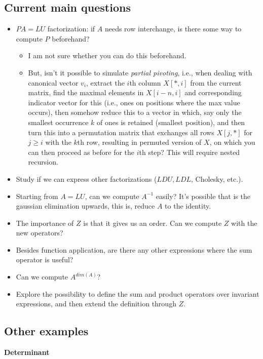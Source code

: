 \subsection{Current main questions}
\begin{itemize}

\item $PA=LU$ factorization: if $A$ needs row interchange, is there some way to compute $P$ beforehand?
\begin{itemize}
\item I am not sure whether you can do this beforehand.
\item But, isn't it possible to simulate \emph{partial pivoting}, i.e., when dealing with canonical vector $v_i$, extract the $i$th column $X[*,i]$ from the current
matrix, find the maximal elements in $X[i-n,i]$ and corresponding indicator vector for this (i.e., ones on positions where the max value occurs), then somehow
reduce this to a vector in which, say only the smallest occurrence $k$ of ones is retained (smallest position), and then turn this into a permutation matrix that exchanges
all rows $X[j,*]$ for $j\geq i$ with the $k$th row, resulting in permuted version of $X$, on which you can then proceed as before for the $i$th step? This will require nested
recursion.
\end{itemize}
\item Study if we can express other factorizations ($LDU, LDL$,
Cholesky, etc.).
\item Starting from $A=LU$, can we compute $A^{-1}$ easily? It's possible that is the gaussian elimination upwards, this is, reduce $A$ to the identity.
\item The importance of $Z$ is that it gives us an order. Can we compute $Z$ with the new operators?
\item Besides function application, are there any other expressions where the sum operator is useful?
\item Can we compute $A^{dim(A)}$?
\item Explore the possibility to define the sum and product operators over invariant expressions, and then extend the definition through $Z$.

\end{itemize}

\subsection{Other examples}

\textbf{Determinant}


